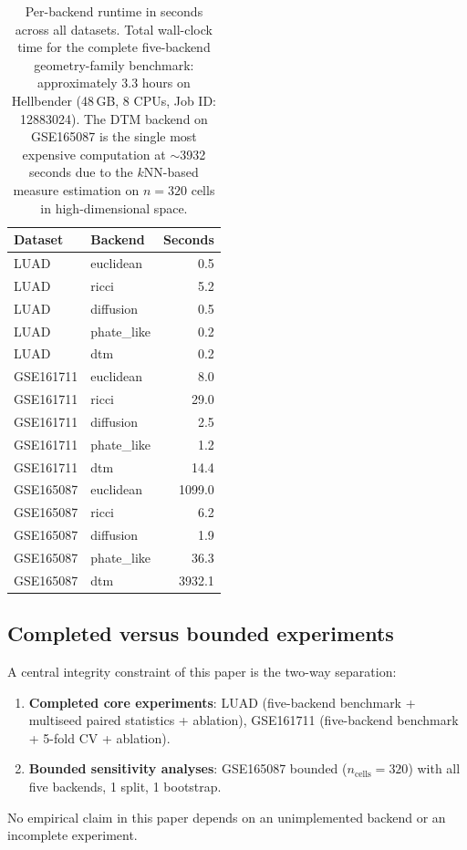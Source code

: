 \documentclass[11pt]{article}
\begin{document}
\begin{table}[h]
\centering
\small
\begin{tabular}{llr}
\toprule
Dataset & Backend & Seconds \\
\midrule
LUAD & euclidean & 0.5 \\
LUAD & ricci & 5.2 \\
LUAD & diffusion & 0.5 \\
LUAD & phate\_like & 0.2 \\
LUAD & dtm & 0.2 \\
\midrule
GSE161711 & euclidean & 8.0 \\
GSE161711 & ricci & 29.0 \\
GSE161711 & diffusion & 2.5 \\
GSE161711 & phate\_like & 1.2 \\
GSE161711 & dtm & 14.4 \\
\midrule
GSE165087 & euclidean & 1099.0 \\
GSE165087 & ricci & 6.2 \\
GSE165087 & diffusion & 1.9 \\
GSE165087 & phate\_like & 36.3 \\
GSE165087 & dtm & 3932.1 \\
\bottomrule
\end{tabular}
\caption{Per-backend runtime in seconds across all datasets.
Total wall-clock time for the complete five-backend geometry-family benchmark: approximately 3.3 hours on Hellbender (48\,GB, 8 CPUs, Job ID: 12883024).
The DTM backend on GSE165087 is the single most expensive computation at ${\sim}$3932 seconds due to the $k$NN-based measure estimation on $n = 320$ cells in high-dimensional space.}
\label{tab:timing}
\end{table}

\subsection{Completed versus bounded experiments}

A central integrity constraint of this paper is the two-way separation:
\begin{enumerate}[leftmargin=1.5em]
\item \textbf{Completed core experiments}: LUAD (five-backend benchmark + multiseed paired statistics + ablation), GSE161711 (five-backend benchmark + 5-fold CV + ablation).
\item \textbf{Bounded sensitivity analyses}: GSE165087 bounded ($n_{\text{cells}} = 320$) with all five backends, 1 split, 1 bootstrap.
\end{enumerate}
No empirical claim in this paper depends on an unimplemented backend or an incomplete experiment.
\end{document}
